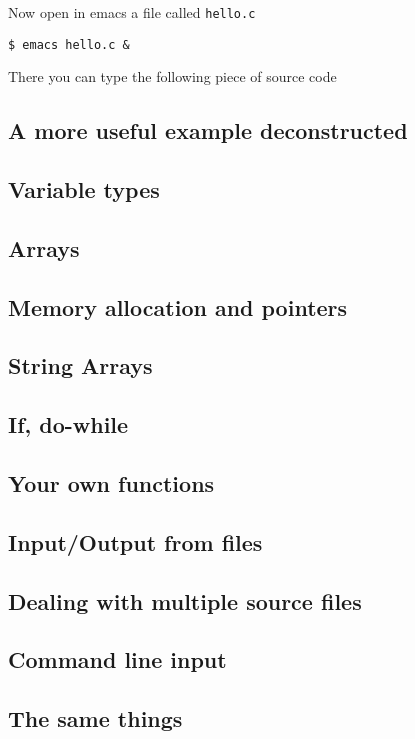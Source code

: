 \documentclass{article}
\begin{document}
Now open in emacs a file called \verb"hello.c"
\begin{verbatim}
$ emacs hello.c &
\end{verbatim}

There you can type the following piece of source code

\subsection{A more useful example deconstructed}


\subsection{Variable types}

\subsection{Arrays}

\subsection{Memory allocation and pointers}

\subsection{String Arrays}

\subsection{If, do-while}

\subsection{Your own functions}

\subsection{Input/Output from files}

\subsection{Dealing with multiple source files}

\subsection{Command line input}

\subsection{The same things}
\end{document}
